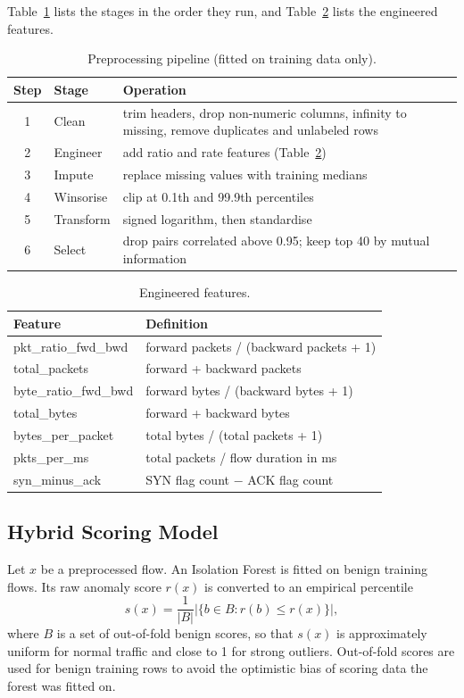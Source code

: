 \documentclass[conference]{IEEEtran}
\begin{document}
Table~\ref{tab:prep} lists the stages in the order they run, and Table~\ref{tab:fe} lists the engineered features.

\begin{table}[!htb]
\caption{Preprocessing pipeline (fitted on training data only).}
\label{tab:prep}
\centering\footnotesize
\begin{tabular}{@{}cp{2.2cm}p{4.2cm}@{}}
\hline
Step & Stage & Operation \\
\hline
1 & Clean & trim headers, drop non-numeric columns, infinity to missing, remove duplicates and unlabeled rows \\
2 & Engineer & add ratio and rate features (Table~\ref{tab:fe}) \\
3 & Impute & replace missing values with training medians \\
4 & Winsorise & clip at 0.1th and 99.9th percentiles \\
5 & Transform & signed logarithm, then standardise \\
6 & Select & drop pairs correlated above 0.95; keep top 40 by mutual information \\
\hline
\end{tabular}
\end{table}

\begin{table}[!htb]
\caption{Engineered features.}
\label{tab:fe}
\centering\footnotesize
\begin{tabular}{@{}p{2.5cm}p{4.9cm}@{}}
\hline
Feature & Definition \\
\hline
pkt\_ratio\_fwd\_bwd & forward packets / (backward packets + 1) \\
total\_packets & forward + backward packets \\
byte\_ratio\_fwd\_bwd & forward bytes / (backward bytes + 1) \\
total\_bytes & forward + backward bytes \\
bytes\_per\_packet & total bytes / (total packets + 1) \\
pkts\_per\_ms & total packets / flow duration in ms \\
syn\_minus\_ack & SYN flag count $-$ ACK flag count \\
\hline
\end{tabular}
\end{table}

\subsection{Hybrid Scoring Model}
Let $x$ be a preprocessed flow. An Isolation Forest is fitted on benign training flows. Its raw anomaly score $r(x)$ is converted to an empirical percentile
\begin{equation}
s(x)=\frac{1}{|B|}\left|\{b\in B : r(b)\le r(x)\}\right|,
\end{equation}
where $B$ is a set of out-of-fold benign scores, so that $s(x)$ is approximately uniform for normal traffic and close to 1 for strong outliers. Out-of-fold scores are used for benign training rows to avoid the optimistic bias of scoring data the forest was fitted on.
\end{document}
